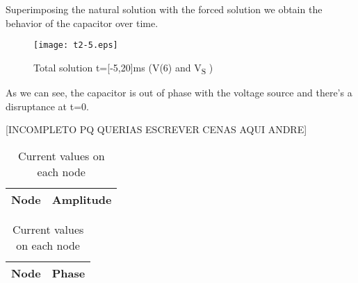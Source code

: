 Superimposing the natural solution with the forced solution we obtain the behavior of the capacitor over time.

\begin{figure}[h] \centering
\texttt{[image: t2-5.eps]}
\caption{Total solution t=[-5,20]ms (V(6) and V\textsubscript S )}
\label{fig:natural}
\end{figure}

As we can see, the capacitor is out of phase with the voltage source and there's a disruptance at t=0.

[INCOMPLETO PQ QUERIAS ESCREVER CENAS AQUI ANDRE]
\begin{table}[!htb]
    \begin{minipage}{.5\linewidth}
      
      \centering
        \begin{tabular}{|c|c|}
        \hline    
        {\bf Node} & {\bf Amplitude} \\ \hline
        
        \end{tabular}
        \caption{Amplitude values on each node}
    \end{minipage}%
    \begin{minipage}{.5\linewidth}
      \centering
        
        \begin{tabular}{|c|c|}
        \hline    
        {\bf Node} & {\bf Phase} \\ \hline
        
        \end{tabular}
        \caption{Current values on each node }
    \end{minipage} 
\end{table}




